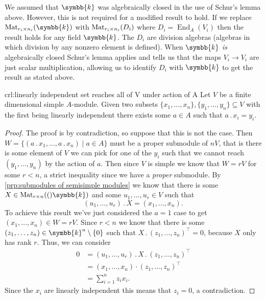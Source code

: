 \documentclass[fleqn]{NotesClass}
\renewcommand{\field}{\symbb{k}}
\DeclareMathOperator{\End}{End}
\newcommand{\action}{\mathbin{.}}
\newcommand{\trans}{\top}
\begin{document}
    \begin{remark}{}{}
        We assumed that \(\field\) was algebraically closed in the use of Schur's lemma above.
        However, this is not required for a modified result to hold.
        If we replace \(\matrices[r_i]{n_i}{\field}\) with \(\matrices[r_i]{n_i}{D_i}\) where \(D_i = \End_A (V_i)\) then the result holds for any field \(\field\).
        The \(D_i\) are division algebras (algebras in which division by any nonzero element is defined).
        When \(\field\) \emph{is} algebraically closed Schur's lemma applies and tells us that the maps \(V_i \to V_i\) are just scalar multiplication, allowing us to identify \(D_i\) with \(\field\) to get the result as stated above.
    \end{remark}
    
    \begin{crl}{}{crl:linearly independent set reaches all of V under action of A}
        Let \(V\) be a finite dimensional simple \(A\)-module.
        Given two subsets \(\{x_1, \dotsc, x_n\}, \{y_1, \dotsc, y_n\} \subseteq V\) with the first being linearly independent there exists some \(a \in A\) such that \(a \action x_i = y_i\).
        \begin{proof}
            The proof is by contradiction, so suppose that this is not the case.
            Then \(W = \{(a \action x_1, \dotsc, a \action x_n) \mid a \in A\}\) must be a proper submodule of \(nV\), that is there is some element of \(V\) we can pick for one of the \(y_i\) such that we cannot reach \((y_1, \dotsc, y_n)\) by the action of \(a\).
            Then since \(V\) is simple we know that \(W = rV\) for some \(r < n\), a strict inequality since we have a \emph{proper} submodule.
            By \cref{prp:submodules of semisimple modules} we know that there is some \(X \in \matrices[r]{n}(\field)\) and some \(u_1, \dotsc, u_r \in V\) such that
            \begin{equation}
                (u_1, \dotsc, u_r) \action X = (x_1, \dotsc, x_n).
            \end{equation}
            To achieve this result we've just considered the \(a = 1\) case to get \((x_1, \dotsc, x_n) \in W = rV\).
            Since \(r < n\) we know that there is some \((z_1, \dotsc, z_n) \in \field^n \setminus \{0\}\) such that \(X \action (z_1, \dotsc, z_n)^{\trans} = 0\), because \(X\) only has rank \(r\).
            Thus, we can consider
            \begin{align}
                0 &= (u_1, \dotsc, u_r) \action X \action (z_1, \dotsc, z_n)^{\trans}\\
                &= (x_1, \dotsc, x_n) \cdot (z_1, \dotsc, z_n)^{\trans}\\
                &= \sum_{i=1}^n z_i x_i.
            \end{align}
            Since the \(x_i\) are linearly independent this means that \(z_i = 0\), a contradiction. 
        \end{proof}
    \end{crl}
    
\end{document}
